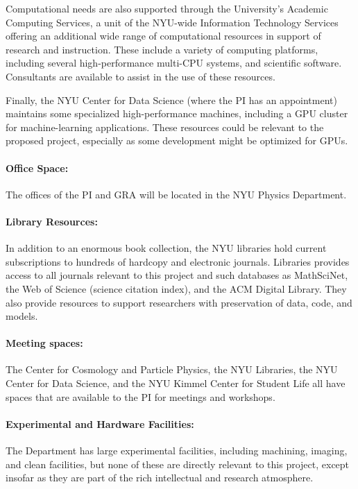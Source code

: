 \documentclass[12pt]{article}
\begin{document}
Computational needs are also supported through the University's
Academic Computing Services, a unit of the NYU-wide Information
Technology Services offering an additional wide range of computational
resources in support of research and instruction.  These include a
variety of computing platforms, including several high-performance
multi-CPU systems, and scientific software.  Consultants are available
to assist in the use of these resources.

Finally, the NYU Center for Data Science (where the PI has an appointment)
maintains some specialized high-performance machines, including a GPU
cluster for machine-learning
applications. These resources could be relevant to the proposed project,
especially as some development might be optimized for GPUs.

\paragraph{Office Space:}

The offices of the PI and GRA will be located in the NYU Physics
Department.

\paragraph{Library Resources:}

In addition to an enormous book collection, the NYU libraries hold
current subscriptions to hundreds of hardcopy and electronic journals.
Libraries provides access to all journals relevant to this project and such
databases as MathSciNet, the Web of Science (science citation index),
and the ACM Digital Library. They also provide resources to support
researchers with preservation of data, code, and models.

\paragraph{Meeting spaces:}

The Center for Cosmology and Particle Physics, the NYU Libraries, the
NYU Center for Data Science, and the NYU Kimmel Center for Student
Life all have spaces that are available to the PI for meetings and
workshops.

\paragraph{Experimental and Hardware Facilities:}

The Department has large experimental facilities, including machining,
imaging, and clean facilities, but none of these are directly relevant
to this project, except insofar as they are part of the rich
intellectual and research atmosphere.
\end{document}
